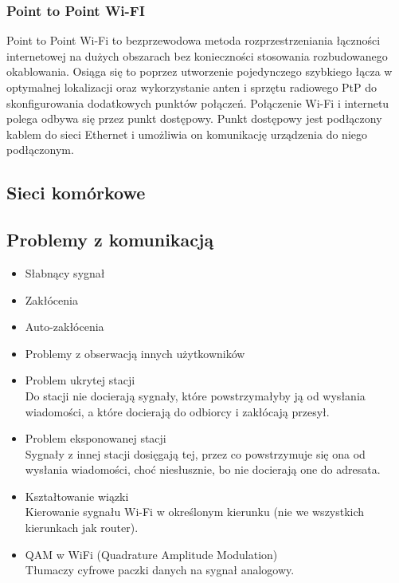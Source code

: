 \documentclass[]{article}
\begin{document}
\subsubsection{Point to Point Wi-FI}
Point to Point Wi-Fi to bezprzewodowa metoda rozprzestrzeniania łączności internetowej na dużych obszarach bez konieczności stosowania rozbudowanego okablowania. Osiąga się to poprzez utworzenie pojedynczego szybkiego łącza w optymalnej lokalizacji oraz wykorzystanie anten i sprzętu radiowego PtP do skonfigurowania dodatkowych punktów połączeń.
Połączenie Wi-Fi i internetu polega odbywa się przez punkt dostępowy. Punkt dostępowy jest podłączony kablem do sieci Ethernet i umożliwia on komunikację urządzenia do niego podłączonym.
\subsection{Sieci komórkowe}
\subsection{Problemy z komunikacją}
\begin{itemize}
    \item Słabnący sygnał
    \item Zakłócenia
    \item Auto-zakłócenia
    \item Problemy z obserwacją innych użytkowników
    \item Problem ukrytej stacji \\
    Do stacji nie docierają sygnały, które powstrzymałyby ją od wysłania wiadomości, a które docierają do odbiorcy i zakłócają przesył.
    \item Problem eksponowanej stacji \\
    Sygnały z innej stacji dosięgają tej, przez co powstrzymuje się ona od wysłania wiadomości, choć niesłusznie, bo nie docierają one do adresata.
    \item Kształtowanie wiązki \\
    Kierowanie sygnału Wi-Fi w określonym kierunku (nie we wszystkich kierunkach jak router).
    \item QAM w WiFi (Quadrature Amplitude Modulation) \\
    Tłumaczy cyfrowe paczki danych na sygnał analogowy.
\end{itemize}
\end{document}
